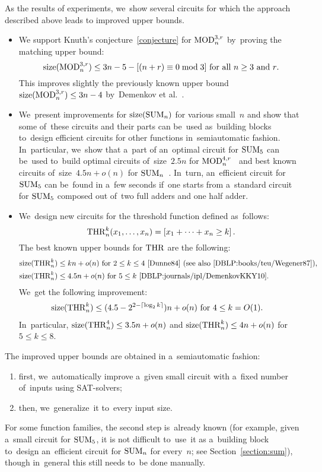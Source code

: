 As the results of experiments, we~show several circuits
for which the approach described above leads to improved upper bounds.
\begin{itemize}
    \item We support Knuth's conjecture~\eqref{conjecture} for $\operatorname{MOD}_n^{3,r}$ by~proving the matching upper bound:
    \[\operatorname{size}(\operatorname{MOD}_n^{3,r}) \le 3n-5-[(n+r) \equiv 0\bmod 3] \text{ for all $n \ge 3$ and $r$.}\]
    This improves slightly the previously known upper bound $\operatorname{size}(\operatorname{MOD}_n^{3,r}) \le 3n-4$ by~Demenkov et al.~\cite{DBLP:journals/ipl/DemenkovKKY10}.
    \item We~present improvements for $\operatorname{size}(\operatorname{SUM}_n)$ for various small~$n$ and show that some of~these circuits and their parts can be~used as~building blocks to~design efficient circuits for other functions in~semiautomatic fashion. In~particular, we~show that a~part of an~optimal circuit for $\operatorname{SUM}_5$ can be~used to~build optimal circuits of~size~$2.5n$ for $\operatorname{MOD}_n^{4,r}$~\cite{DBLP:journals/mst/Stockmeyer77} and best known circuits of~size~$4.5n+o(n)$ for $\operatorname{SUM}_n$~\cite{DBLP:journals/ipl/DemenkovKKY10}.
    In~turn, an~efficient circuit for $\operatorname{SUM}_5$ can be~found
    in a~few seconds if~one starts from a~standard circuit for $\operatorname{SUM}_5$ composed
    out of~two full adders and one half adder.
    \item We~design new circuits for the threshold function defined as~follows:
    \[\operatorname{THR}_n^k(x_1, \dotsc, x_n)=[x_1+\dotsb+x_n \ge k] \, .\]
    The best known upper bounds for $\operatorname{THR}$ are the following:
    \begin{align*}
        \size(\THR_n^k) &\le kn+o(n) \text{ for $2 \le k \le 4$~\cite{Dunne84} (see also~\cite[6.2, Theorem~2.3]{DBLP:books/teu/Wegener87}),}\\
        \size(\THR_n^k) &\le 4.5n+o(n) \text{ for $5 \le k$~\cite{DBLP:journals/ipl/DemenkovKKY10}.}
    \end{align*}
    We~get the following improvement:
    \begin{align*}
        \operatorname{size}(\operatorname{THR}_n^k) &\le (4.5-2^{2-\lceil\log_2k\rceil})n+o(n) \text{ for $4 \le k = O(1)$.}
    \end{align*}
    In~particular, $\operatorname{size}(\operatorname{THR}_n^4) \le 3.5n+o(n)$ and $\operatorname{size}(\operatorname{THR}_n^k) \le 4n+o(n)$ for $5 \le k \le 8$.
\end{itemize}
The improved upper bounds are obtained in a~semiautomatic fashion:
\begin{enumerate}
    \item first, we~automatically improve a~given small circuit with a~fixed number of~inputs using SAT-solvers;
    \item then, we~generalize~it to~every input size.
\end{enumerate}
For some function families,
the second step is~already known (for example, given a~small circuit
for $\operatorname{SUM}_5$, it is not difficult to~use~it as a~building block
to~design an~efficient circuit for $\operatorname{SUM}_n$ for every~$n$; see Section~\ref{section:sum}), though in~general this still needs to~be
done manually.

